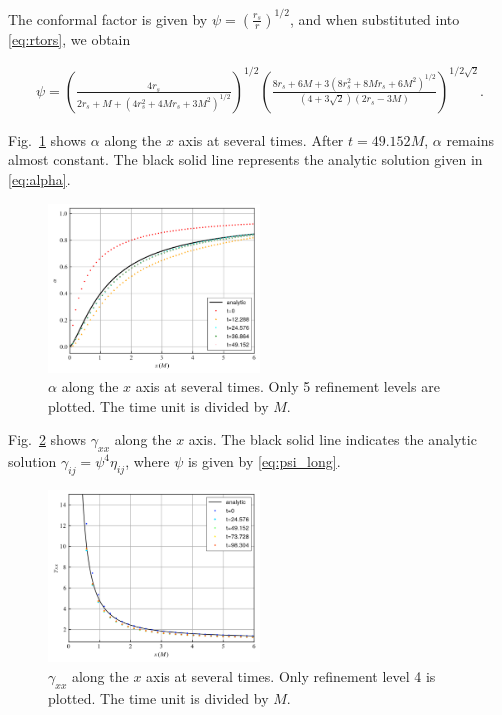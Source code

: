 \documentclass[%
 reprint,
 amsmath,amssymb,
 aps,
 prd,
]{revtex4-2}
\begin{document}
The conformal factor is given by $\psi = \left(\frac{r_s}{r}\right)^{1/2}$, and when substituted into \eqref{eq:rtors}, we obtain
\begin{widetext}
	\begin{eqnarray}
		\label{eq:psi_long}
		\psi = \left(\frac{4r_s}{2r_s + M + (4r_s^2 + 4Mr_s + 3M^2)^{1/2}}\right)^{1/2}\left(\frac{8r_s + 6M + 3 (8r_s^2 + 8Mr_s + 6M^2)^{1/2}}{(4+3\sqrt{2})(2r_s - 3M)}\right)^{1/2\sqrt{2}}.
	\end{eqnarray}
\end{widetext}

Fig.~\ref{fig:alphas} shows $\alpha$ along the $x$ axis at several times. After $t=49.152M$, $\alpha$ remains almost constant. The black solid line represents the analytic solution given in \eqref{eq:alpha}.
\begin{figure}[ht!]
	\includegraphics[width=0.5\textwidth]{data/alphas.png}%
	\caption{\label{fig:alphas} $\alpha$ along the $x$ axis at several times. Only 5 refinement levels are plotted. The time unit is divided by $M$.}
\end{figure}

Fig.~\ref{fig:ev_gammaxx} shows $\gamma_{xx}$ along the $x$ axis. The black solid line indicates the analytic solution $\gamma_{ij} = \psi^4 \eta_{ij}$, where $\psi$ is given by \eqref{eq:psi_long}.

\begin{figure}[ht!]
	\includegraphics[width=0.5\textwidth]{data/ev_gammaxx.png}%
	\caption{\label{fig:ev_gammaxx} $\gamma_{xx}$ along the $x$ axis at several times. Only refinement level 4 is plotted. The time unit is divided by $M$.}
\end{figure}
\end{document}
